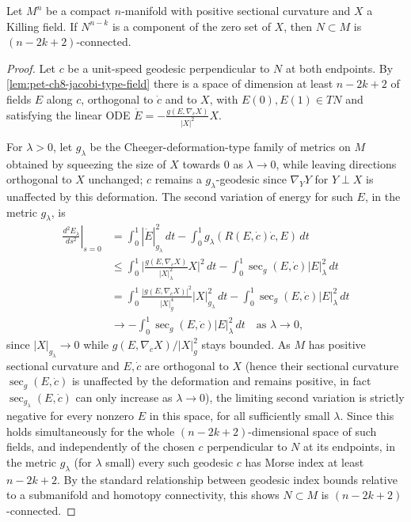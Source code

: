 \begin{lemma}
  \label{lem:pet-ch8-wilking-connectedness-principle}
  Let $M^n$ be a compact $n$-manifold with positive sectional curvature and $X$
  a Killing field. If $N^{n-k}$ is a component of the zero set of $X$, then
  $N\subset M$ is $(n-2k+2)$-connected.
\end{lemma}
\begin{proof}
  Let $c$ be a unit-speed geodesic perpendicular to $N$ at both endpoints. By
  \cref{lem:pet-ch8-jacobi-type-field} there is a space of dimension at least
  $n-2k+2$ of fields $E$ along $c$, orthogonal to $\dot c$ and to $X$, with
  $E(0),E(1)\in TN$ and satisfying the linear ODE
  $\dot E=-\tfrac{g(E,\nabla_{\dot c}X)}{|X|^2}X$.

  For $\lambda>0$, let $g_\lambda$ be the Cheeger-deformation-type family of
  metrics on $M$ obtained by squeezing the size of $X$ towards $0$ as
  $\lambda\to0$, while leaving directions orthogonal to $X$ unchanged; $c$
  remains a $g_\lambda$-geodesic since $\nabla_YY$ for $Y\perp X$ is unaffected
  by this deformation. The second variation of energy for such $E$, in the
  metric $g_\lambda$, is
  \begin{align*}
    \left.\frac{d^2E_\lambda}{ds^2}\right|_{s=0}
    &=\int_0^1|\dot E|_{g_\lambda}^2\,dt-\int_0^1g_\lambda(R(E,\dot c)\dot c,E)\,dt\\
    &\le\int_0^1\Big|\frac{g(E,\nabla_{\dot c}X)}{|X|_\lambda^2}X\Big|^2\,dt
      -\int_0^1\sec_g(E,\dot c)|E|_\lambda^2\,dt\\
    &=\int_0^1\frac{|g(E,\nabla_{\dot c}X)|^2}{|X|_g^4}|X|_{g_\lambda}^2\,dt
      -\int_0^1\sec_g(E,\dot c)|E|_\lambda^2\,dt\\
    &\longrightarrow-\int_0^1\sec_g(E,\dot c)|E|_\lambda^2\,dt\quad\text{as }\lambda\to0,
  \end{align*}
  since $|X|_{g_\lambda}\to0$ while $g(E,\nabla_{\dot c}X)/|X|_g^2$ stays
  bounded. As $M$ has positive sectional curvature and $E,\dot c$ are
  orthogonal to $X$ (hence their sectional curvature $\sec_g(E,\dot c)$ is
  unaffected by the deformation and remains positive, in fact $\sec_{g_\lambda}(E,\dot c)$
  can only increase as $\lambda\to0$), the limiting second variation is
  strictly negative for every nonzero $E$ in this space, for all sufficiently
  small $\lambda$. Since this holds simultaneously for the whole
  $(n-2k+2)$-dimensional space of such fields, and independently of the chosen
  $c$ perpendicular to $N$ at its endpoints, in the metric $g_\lambda$ (for
  $\lambda$ small) every such geodesic $c$ has Morse index at least $n-2k+2$.
  By the standard relationship between geodesic index bounds relative to a
  submanifold and homotopy connectivity, this shows $N\subset M$ is
  $(n-2k+2)$-connected.
\end{proof}

